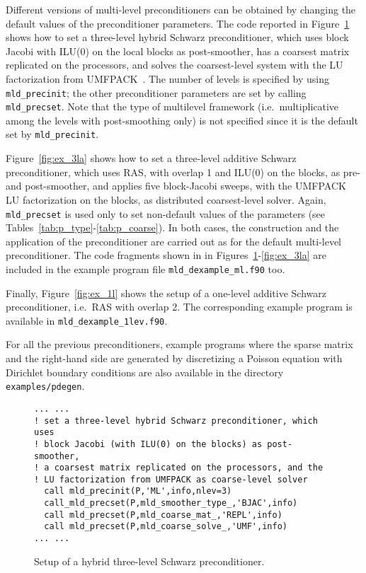 Different versions of multi-level preconditioners can be obtained by changing
the default values of the preconditioner parameters. The code reported in
Figure~\ref{fig:ex_3lh} shows how to set a three-level hybrid Schwarz
preconditioner, which uses block Jacobi with ILU(0) on the
local blocks as post-smoother, has a coarsest matrix replicated on the processors,
and solves the coarsest-level system with the LU factorization from UMFPACK~\cite{UMFPACK}.
The number of levels is specified by using \verb|mld_precinit|; the other
preconditioner parameters are set by calling \verb|mld_precset|. Note that
the type of multilevel framework (i.e.\ multiplicative among the levels
with post-smoothing only) is not specified since it is the default 
set by \verb|mld_precinit|. 

Figure~\ref{fig:ex_3la} shows how to
set a three-level additive Schwarz preconditioner,
which uses RAS, with overlap 1 and ILU(0) on the blocks, 
as pre- and post-smoother, and applies five block-Jacobi sweeps, with
the UMFPACK LU factorization on the blocks, as distributed coarsest-level
solver. Again, \verb|mld_precset| is used only to set
non-default values of the parameters (see Tables~\ref{tab:p_type}-\ref{tab:p_coarse}).
In both cases, the construction and the application of the preconditioner
are carried out as for the default multi-level preconditioner.
The code fragments shown in in Figures~\ref{fig:ex_3lh}-\ref{fig:ex_3la} are
included in the example program file \verb|mld_dexample_ml.f90| too.

Finally, Figure~\ref{fig:ex_1l} shows the setup of a one-level
additive Schwarz preconditioner, i.e.\ RAS with overlap 2. The corresponding
example program is available in \verb|mld_dexample_1lev.f90|.

For all the previous preconditioners, example programs where the sparse matrix and
the right-hand side are generated by discretizing a Poisson equation with Dirichlet
boundary conditions are also available in the directory \verb|examples/pdegen|.


\begin{figure}[tbh]
\begin{center}
\begin{minipage}{.90\textwidth} 
{\small
\begin{verbatim}
... ...
! set a three-level hybrid Schwarz preconditioner, which uses 
! block Jacobi (with ILU(0) on the blocks) as post-smoother,
! a coarsest matrix replicated on the processors, and the 
! LU factorization from UMFPACK as coarse-level solver
  call mld_precinit(P,'ML',info,nlev=3)
  call_mld_precset(P,mld_smoother_type_,'BJAC',info)
  call mld_precset(P,mld_coarse_mat_,'REPL',info)
  call mld_precset(P,mld_coarse_solve_,'UMF',info)
... ...
\end{verbatim}
}
\end{minipage}

\caption{Setup of a hybrid three-level Schwarz preconditioner.\label{fig:ex_3lh}}
\end{center}
\end{figure}

